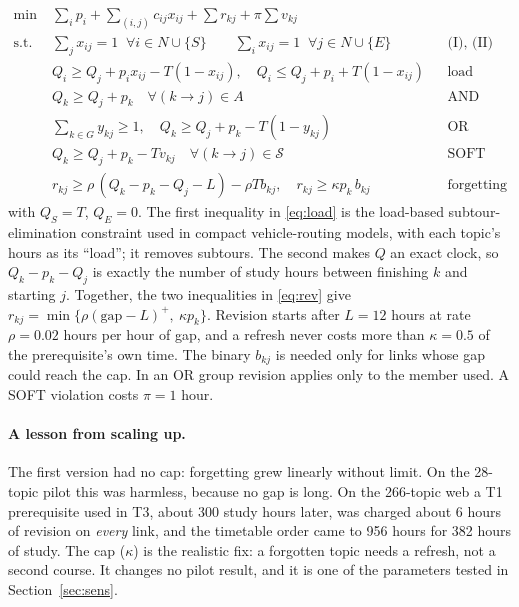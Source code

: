 \documentclass[11pt,a4paper]{article}
\begin{document}
\begin{align}
\min\;& \textstyle\sum_i p_i + \sum_{(i,j)} c_{ij}x_{ij} + \sum r_{kj} + \pi\sum v_{kj} \label{eq:obj}\\
\text{s.t. }& \textstyle\sum_j x_{ij}=1 \;\; \forall i\in N\cup\{S\} \qquad \sum_i x_{ij}=1 \;\; \forall j\in N\cup\{E\} && \text{(I), (II)}\label{eq:deg}\\
& Q_i \ge Q_j + p_i x_{ij} - T(1-x_{ij}),\quad Q_i \le Q_j + p_i + T(1-x_{ij}) && \text{load}\label{eq:load}\\
& Q_k \ge Q_j + p_k \quad \forall (k\to j)\in A && \text{AND}\label{eq:and}\\
& \textstyle\sum_{k\in G} y_{kj}\ge 1,\quad Q_k \ge Q_j + p_k - T(1-y_{kj}) && \text{OR}\label{eq:or}\\
& Q_k \ge Q_j + p_k - T v_{kj} \quad \forall (k\to j)\in\mathcal S && \text{SOFT}\label{eq:soft}\\
& r_{kj} \ge \rho\,(Q_k - p_k - Q_j - L) - \rho T b_{kj},\quad r_{kj} \ge \kappa p_k\, b_{kj} && \text{forgetting (capped)}\label{eq:rev}
\end{align}
with $Q_S=T$, $Q_E=0$. The first inequality in \eqref{eq:load} is the load-based subtour-elimination constraint used in compact vehicle-routing models, with each topic's hours as its ``load''; it removes subtours. The second makes $Q$ an exact clock, so $Q_k-p_k-Q_j$ is exactly the number of study hours between finishing $k$ and starting $j$. Together, the two inequalities in \eqref{eq:rev} give $r_{kj}=\min\{\rho(\text{gap}-L)^+,\ \kappa p_k\}$. Revision starts after $L=12$ hours at rate $\rho=0.02$ hours per hour of gap, and a refresh never costs more than $\kappa=0.5$ of the prerequisite's own time. The binary $b_{kj}$ is needed only for links whose gap could reach the cap. In an OR group revision applies only to the member used. A SOFT violation costs $\pi=1$ hour.

\paragraph{A lesson from scaling up.} The first version had no cap: forgetting grew linearly without limit. On the 28-topic pilot this was harmless, because no gap is long. On the 266-topic web a T1 prerequisite used in T3, about 300 study hours later, was charged about 6 hours of revision on \emph{every} link, and the timetable order came to 956 hours for 382 hours of study. The cap ($\kappa$) is the realistic fix: a forgotten topic needs a refresh, not a second course. It changes no pilot result, and it is one of the parameters tested in Section~\ref{sec:sens}.
\end{document}
